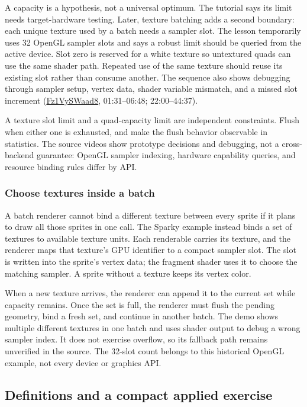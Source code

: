 A capacity is a hypothesis, not a universal optimum. The tutorial says its limit needs target-hardware testing. Later, texture batching adds a second boundary: each unique texture used by a batch needs a sampler slot. The lesson temporarily uses 32 OpenGL sampler slots and says a robust limit should be queried from the active device. Slot zero is reserved for a white texture so untextured quads can use the same shader path. Repeated use of the same texture should reuse its existing slot rather than consume another. The sequence also shows debugging through sampler setup, vertex data, shader variable mismatch, and a missed slot increment (\href{https://www.youtube.com/watch?v=Fz1VySWaad8}{Fz1VySWaad8}, 01:31--06:48; 22:00--44:37).

A texture slot limit and a quad-capacity limit are independent constraints. Flush when either one is exhausted, and make the flush behavior observable in statistics. The source videos show prototype decisions and debugging, not a cross-backend guarantee: OpenGL sampler indexing, hardware capability queries, and resource binding rules differ by API.

\subsubsection{Choose textures inside a batch}\label{06-engine-ii-ch026-choose-textures-inside-a-batch}

A batch renderer cannot bind a different texture between every sprite if it plans to draw all those sprites in one call. The Sparky example instead binds a set of textures to available texture units. Each renderable carries its texture, and the renderer maps that texture's GPU identifier to a compact sampler slot. The slot is written into the sprite's vertex data; the fragment shader uses it to choose the matching sampler. A sprite without a texture keeps its vertex color.

When a new texture arrives, the renderer can append it to the current set while capacity remains. Once the set is full, the renderer must flush the pending geometry, bind a fresh set, and continue in another batch. The demo shows multiple different textures in one batch and uses shader output to debug a wrong sampler index. It does not exercise overflow, so its fallback path remains unverified in the source. The 32-slot count belongs to this historical OpenGL example, not every device or graphics API.

\subsection{Definitions and a compact applied exercise}\label{06-engine-ii-ch026-definitions-and-a-compact-applied-exercise}

